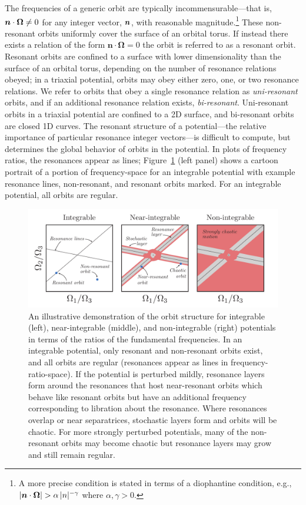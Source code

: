 The frequencies of a generic orbit are typically incommensurable---that is, $\boldsymbol{n} \cdot \boldsymbol{\Omega} \neq 0$ for any integer vector, $\boldsymbol{n}$, with reasonable magnitude.\footnote{A more precise condition is stated in terms of a diophantine condition, e.g., $|\boldsymbol{n} \cdot \boldsymbol{\Omega}| > \alpha \, |n|^{-\gamma}$ where $\alpha, \gamma>0$.} These non-resonant orbits uniformly cover the surface of an orbital torus. If instead there exists a relation of the form $\boldsymbol{n} \cdot \boldsymbol{\Omega} = 0$ the orbit is referred to as a resonant orbit. Resonant orbits are confined to a surface with lower dimensionality than the surface of an orbital torus, depending on the number of resonance relations obeyed; in a triaxial potential, orbits may obey either zero, one, or two resonance relations. We refer to orbits that obey a single resonance relation as \emph{uni-resonant} orbits, and if an additional resonance relation exists, \emph{bi-resonant}. Uni-resonant orbits in a triaxial potential are confined to a 2D surface, and bi-resonant orbits are closed 1D curves. The resonant structure of a potential---the relative importance of particular resonance integer vectors---is difficult to compute, but determines the global behavior of orbits in the potential. In plots of frequency ratios, the resonances appear as lines; Figure~\ref{fig:cartoons} (left panel) shows a cartoon portrait of a portion of frequency-space for an integrable potential with example resonance lines, non-resonant, and resonant orbits marked. For an integrable potential, all orbits are regular.

\begin{figure}[h]
\begin{center}
\includegraphics[width=\textwidth]{figures/ch3/cartoons.pdf}
\caption{An illustrative demonstration of the orbit structure for integrable (left), near-integrable (middle), and non-integrable (right) potentials in terms of the ratios of the fundamental frequencies. In an integrable potential, only resonant and non-resonant orbits exist, and all orbits are regular (resonances appear as lines in frequency-ratio-space). If the potential is perturbed mildly, resonance layers form around the resonances that host near-resonant orbits which behave like resonant orbits but have an additional frequency corresponding to libration about the resonance. Where resonances overlap or near separatrices, stochastic layers form and orbits will be chaotic. For more strongly perturbed potentials, many of the non-resonant orbits may become chaotic but resonance layers may grow and still remain regular. } 
\label{fig:cartoons}
\end{center}
\end{figure}

